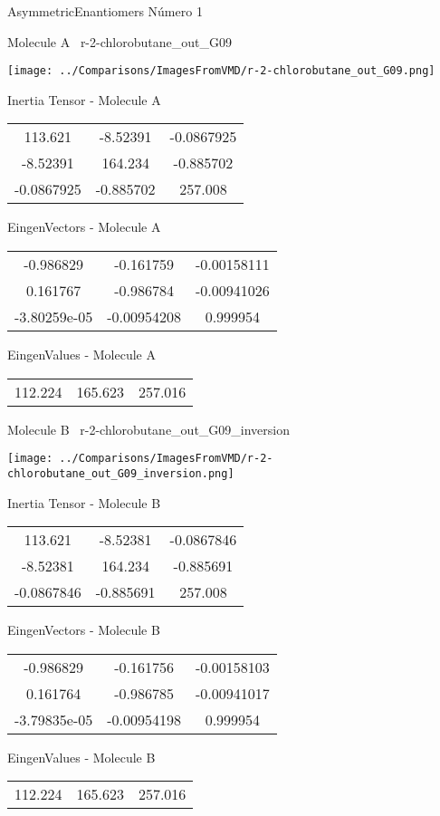 
\vtab[-3cm]
\begin{center}
{\large AsymmetricEnantiomers \tab Número 1}
\end{center}
\begin{multicols}{2}
\begin{center}

Molecule A \
r-2-chlorobutane\_out\_G09

\texttt{[image: ../Comparisons/ImagesFromVMD/r-2-chlorobutane\_out\_G09.png]}

Inertia Tensor - Molecule A \\
\begin{tabular}{|c c c|}
113.621	 & 	-8.52391	 & 	-0.0867925	 \\
-8.52391	 & 	164.234	 & 	-0.885702	 \\
-0.0867925	 & 	-0.885702	 & 	257.008
\end{tabular}

\vtab
 EingenVectors - Molecule A     \\
\begin{tabular}{|c c c|}
-0.986829	 & 	-0.161759	 & 	-0.00158111	 \\
0.161767	 & 	-0.986784	 & 	-0.00941026	 \\
-3.80259e-05	 & 	-0.00954208	 & 	0.999954
\end{tabular}

\vtab
 EingenValues - Molecule A     \\
\begin{tabular}{|c c c|}
112.224	 & 	165.623	 & 	257.016	 \\
\end{tabular}
\columnbreak

Molecule B \
r-2-chlorobutane\_out\_G09\_inversion

\texttt{[image: ../Comparisons/ImagesFromVMD/r-2-chlorobutane\_out\_G09\_inversion.png]}

Inertia Tensor - Molecule B \\
\begin{tabular}{|c c c|}
113.621	 & 	-8.52381	 & 	-0.0867846	 \\
-8.52381	 & 	164.234	 & 	-0.885691	 \\
-0.0867846	 & 	-0.885691	 & 	257.008
\end{tabular}

\vtab
 EingenVectors - Molecule B     \\
\begin{tabular}{|c c c|}
-0.986829	 & 	-0.161756	 & 	-0.00158103	 \\
0.161764	 & 	-0.986785	 & 	-0.00941017	 \\
-3.79835e-05	 & 	-0.00954198	 & 	0.999954
\end{tabular}

\vtab
 EingenValues - Molecule B     \\
\begin{tabular}{|c c c|}
112.224	 & 	165.623	 & 	257.016	 \\
\end{tabular}

\end{center}
\end{multicols}

